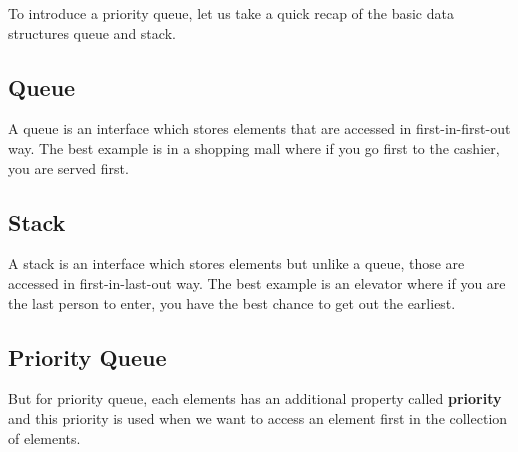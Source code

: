 To introduce a priority queue, let us take a quick recap of the basic data structures queue and stack.
\subsection{Queue}
A queue is an interface which stores elements that are accessed in first-in-first-out way. The best example is in a shopping mall where if you go first to the cashier, you are served first.
\subsection{Stack}
A stack is an interface which stores elements but unlike a queue, those are accessed in first-in-last-out way. The best example is an elevator where if you are the last 
person to enter, you have the best chance to get out the earliest.
\subsection{Priority Queue}
But for priority queue, each elements has an additional property called \textbf{priority} and this priority is used when we want to access an element first in
the collection of elements.




